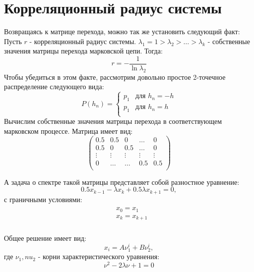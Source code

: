 \section {Корреляционный  радиус системы}
Возвращаясь к матрице перехода, можно так же установить следующий факт:
	Пусть $r$ - корреляционный радиус системы. $\lambda_1 = 1 > \lambda_2 > \dots >\lambda_k$ - собственные значения матрицы перехода марковской цепи. Тогда:
	\begin{equation}
	r = -\frac{1}{\ln \lambda_2}
	\end{equation}
Чтобы убедиться в этом факте, рассмотрим довольно простое 2-точечное распределение следующего вида:
\begin{equation}
P(h_n) =
\begin{cases}
p_1 &\mbox{для } h_n= -h \\
p_1 &\mbox{для } h_n= h\\
\end{cases}
\end{equation}
Вычислим собственные значения матрицы перехода в соответствующем марковском процессе. Матрица имеет вид:
\begin{equation}
\begin{pmatrix}
0.5 & 0.5 & 0 & \dots & 0 \\
0.5 & 0 & 0.5 &\dots & 0\\
\vdots & \vdots & \vdots & \vdots & \vdots\\
0 & \dots & \dots & 0.5 & 0.5\\
\end{pmatrix}
\end{equation} 

А задача о спектре такой матрицы представляет собой разностное уравнение:
\begin{equation}
	0.5 x_{k-1} - \lambda x_{k} + 0.5 \lambda x_{k+1} =0,
\end{equation}
с граничными условиями:
\begin{align}
\begin{split}
	&x_0 = x_1\\
	&x_k = x_{k+1}\\
\end{split}
\end{align}

Общее решение имеет вид:
\begin{equation}
	x_i = A\nu_1^i + B\nu_2^i,
\end{equation}
где $\nu_1, nu_2$ - корни характеристического уравнения:
\begin{equation}
	\nu^2 - 2\lambda \nu + 1 = 0
\end{equation}


